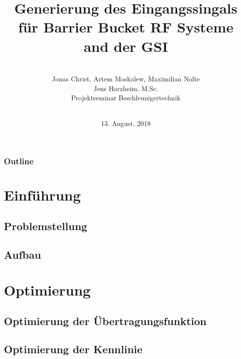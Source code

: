\documentclass[colorbacktitle,inverttitle,landscape,presentation,
	english,
	aspectratio=43, %
	accentcolor=tud9b, %
]{tudbeamer}
\date{13. August, 2018}
\title{Generierung des Eingangssingals für Barrier Bucket RF Systeme and der GSI }
\subtitle{\\[0.3\baselineskip]
	Jonas Christ, Artem Moskalew, Maximilian Nolte \\
{\small Jens Harzheim, M.Sc.}\\
[0.3\baselineskip]
{\tiny Projektseminar Beschleunigertechnik}\\[0.3em]
	\mbox{\scriptsize}~}
\institute[TU Darmstadt | Fachbereich 18 | Institut Theorie Elektromagnetischer Felder]{Institut für Theorie Elektromagnetischer Felder, TU Darmstadt}
\begin{document}
	
\begin{titleframe}
	\end{titleframe}
	
\begin{frame}
	\frametitle{Outline}
	\tableofcontents%
\end{frame}
	

\section{Einführung}

\subsection{Problemstellung}


\subsection{Aufbau}




%

%
%
%

\section{Optimierung}
\subsection{Optimierung der Übertragungsfunktion}
%
%

\subsection{Optimierung der Kennlinie}


%
%
%

%


	
	
\end{document}

